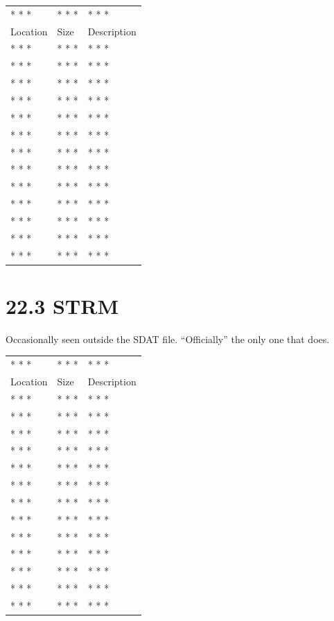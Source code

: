 \documentclass[
]{book}
\begin{document}
\begin{longtable}[]{@{}lll@{}}
\toprule()
\endhead
* * * & * * * & * * * \\
Location & Size & Description \\
* * * & * * * & * * * \\
* * * & * * * & * * * \\
* * * & * * * & * * * \\
* * * & * * * & * * * \\
* * * & * * * & * * * \\
* * * & * * * & * * * \\
* * * & * * * & * * * \\
* * * & * * * & * * * \\
* * * & * * * & * * * \\
* * * & * * * & * * * \\
* * * & * * * & * * * \\
* * * & * * * & * * * \\
* * * & * * * & * * * \\
\bottomrule()
\end{longtable}

\hypertarget{strm}{%
\section{22.3 STRM}\label{strm}}

Occasionally seen outside the SDAT file. ``Officially'' the only one that does.

\begin{longtable}[]{@{}lll@{}}
\toprule()
\endhead
* * * & * * * & * * * \\
Location & Size & Description \\
* * * & * * * & * * * \\
* * * & * * * & * * * \\
* * * & * * * & * * * \\
* * * & * * * & * * * \\
* * * & * * * & * * * \\
* * * & * * * & * * * \\
* * * & * * * & * * * \\
* * * & * * * & * * * \\
* * * & * * * & * * * \\
* * * & * * * & * * * \\
* * * & * * * & * * * \\
* * * & * * * & * * * \\
* * * & * * * & * * * \\
\bottomrule()
\end{longtable}
\end{document}
